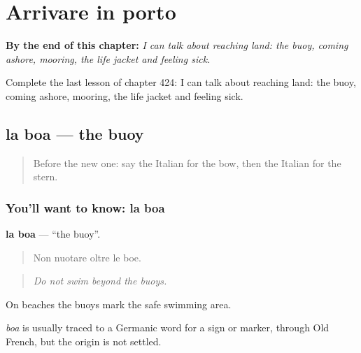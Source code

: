
\chapter{Arrivare in porto}
\label{ch:it-arrivare-in-porto}

\begin{chapteropening}
\textbf{By the end of this chapter:} \emph{I can talk about reaching land: the buoy, coming ashore, mooring, the life jacket and feeling sick.}

Complete the last lesson of chapter 424: I can talk about reaching land: the buoy, coming ashore, mooring, the life jacket and feeling sick.
\end{chapteropening}

\section[la boa]{la boa — the buoy}

\label{lesson:IT-C424-boa}



\begin{quote}
Before the new one: say the Italian for the bow, then the Italian for the stern.
\end{quote}

\subsection*{You'll want to know: la boa}
\textbf{la boa} — \textquotedblleft{}the buoy\textquotedblright{}.

\begin{quote}
Non nuotare oltre le boe.
\end{quote}

\begin{quote}
\emph{Do not swim beyond the buoys.}
\end{quote}

On beaches the buoys mark the safe swimming area.

\begin{cousinweb}
\emph{boa} is usually traced to a Germanic word for a sign or marker, through Old French, but the origin is not settled.
\end{cousinweb}

